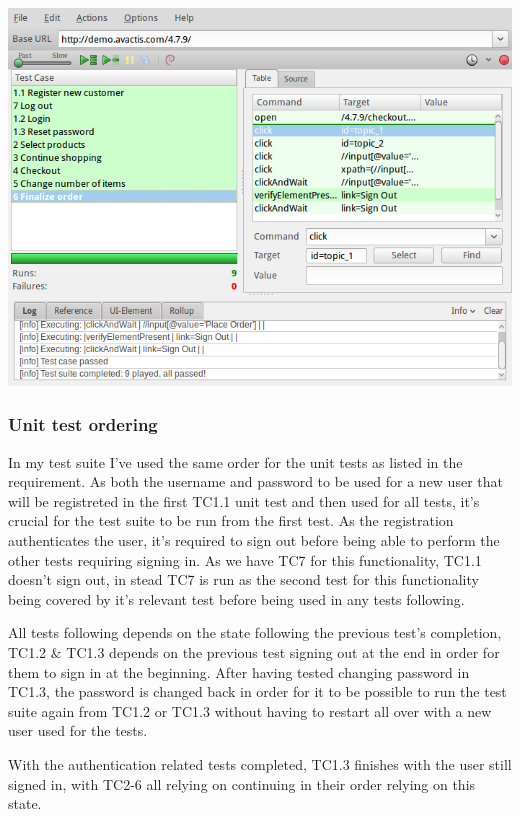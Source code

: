 \documentclass[USenglish]{article}
\begin{document}
\includegraphics[scale=0.7]{TestSuitePassed}

\subsubsection{Unit test ordering}

In my test suite I've used the same order for the unit tests as listed in
the requirement. As both the username and password to be used for a new user
that will be registreted in the first TC1.1 unit test and then used for all
tests, it's crucial for the test suite to be run from the first test.
As the registration authenticates the user, it's required to sign out before
being able to perform the other tests requiring signing in.
As we have TC7 for this functionality, TC1.1 doesn't sign out, in
stead TC7 is run as the second test for this functionality being
covered by it's relevant test before being used in any tests following.

All tests following depends on the state following the previous test's completion,
TC1.2 \& TC1.3 depends on the previous test signing out at the end in order
for them to sign in at the beginning. After having tested changing password in
TC1.3, the password is changed back in order for it to be possible to run the
test suite again from TC1.2 or TC1.3 without having to restart all over with a new
user used for the tests.


With the authentication related tests completed, TC1.3 finishes with the
user still signed in, with TC2-6 all relying on continuing in their
order relying on this state.
\end{document}
